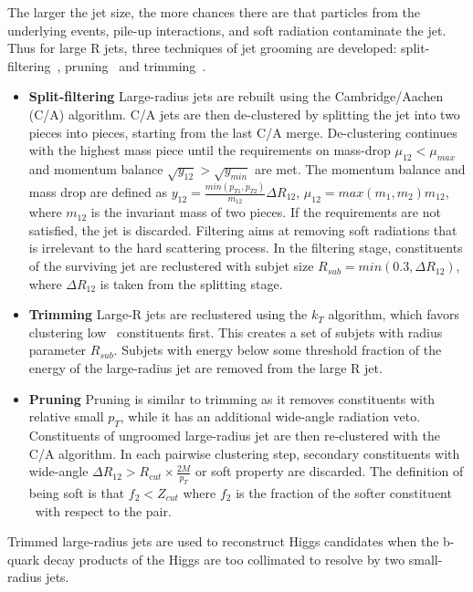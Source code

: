 \par The larger the jet size, the more chances there are that particles from the underlying events, pile-up interactions, and soft radiation contaminate the jet. Thus for large R jets, three techniques of jet grooming are developed:
split-filtering~\cite{Butterworth:2008iy}, pruning~\cite{Ellis:2009me} and trimming~\cite{Krohn:2009th}. 

\begin{itemize}
    \item \textbf{Split-filtering} Large-radius jets are rebuilt using the Cambridge/Aachen (C/A) algorithm. C/A jets are then de-clustered by splitting the jet into two pieces into pieces, starting from the last C/A merge. De-clustering continues with the highest mass piece 
    until the requirements on mass-drop $\mu_{12} < \mu_{max}$ and momentum balance $\sqrt{y_{12}} > \sqrt{y_{min}}$ are met. The momentum balance and mass drop are defined as $y_{12} = \frac{min(p_{T1},p_{T2})}{m_{12}}\Delta R_{12} $, $\mu_{12} = max(m_1,m_2) m_{12}$, where $m_{12}$ 
    is the invariant mass of two pieces. If the requirements are not satisfied, the jet is discarded. Filtering aims at removing soft radiations that is irrelevant to the hard scattering process. 
    In the filtering stage, constituents of the surviving jet are reclustered with subjet size $R_{sub} = min(0.3,\Delta R_{12})$, where $\Delta R_{12}$ is taken from the splitting stage.
    \item \textbf{Trimming} Large-R jets are reclustered using the $k_T$ algorithm, 
    which favors clustering low \pt~constituents first. This creates a set of subjets with radius parameter $R_{sub}$. 
    Subjets with energy below some threshold fraction of the energy of the large-radius jet are removed from the large R jet.
    \item \textbf{Pruning} Pruning is similar to trimming as it removes constituents with relative small $p_T$, while it has an additional wide-angle radiation veto. 
    Constituents of ungroomed large-radius jet are then re-clustered with the C/A algorithm. In each pairwise clustering step, secondary constituents with wide-angle 
    $\Delta R_{12} > R_{cut} \times \frac{2M}{p_T}$ or soft property are discarded. The definition of being soft is that $f_2 < Z_{cut}$ where $f_2$ is the fraction of the softer constituent \pt~with respect to the pair.
\end{itemize}

\par Trimmed large-radius jets are used to reconstruct Higgs candidates when the b-quark decay products of the Higgs are too collimated to resolve by two small-radius jets.

